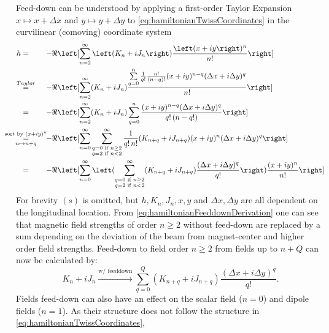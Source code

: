 Feed-down can be understood by applying a first-order Taylor Expansion $x \mapsto x + \Delta x$ and $y \mapsto y + \Delta y$
to \cref{eq:hamiltonianTwissCoordinates} in the 
curvilinear (comoving) coordinate system
%
\begin{equation}
   \label{eq:hamiltonianFeeddownDerivation}
   \begin{split}
   h
   &= \qquad 
   -\ReOf{\sum_{n = 2}^\infty \left(K_n + iJ_n\right)\frac{\left(x+iy\right)^n}{n!}} \\
   &\overeq{Taylor} \qquad
    -\ReOf{
        \sum_{n = 2}^\infty (K_n + iJ_n)
        \frac{\sum\limits_{q=0}^{n} \frac{1}{q!} \frac{n!}{(n-q)!}(x+iy)^{n-q} (\Delta x + i \Delta y)^q}{n!}
    } \\
    &=\qquad
     -\ReOf{
         \sum_{n = 2}^\infty (K_n + iJ_n)
         \sum\limits_{q = 0}^{n} \frac{(x+iy)^{n-q} (\Delta x + i \Delta y)^q}{q!\, (n-q!)} 
      } \\
     &\myoverunder{\text{sort by } (x + iy)^n}{=}{n \mapsto n+q} \qquad
     - \ReOf{
        \sum_{n = 0}^\infty \sum_{\substack{q=0 \text{ if } n \geq 2 \\ q = 2 \text{  if } n < 2 }}^{\infty} \frac{1}{q!\, n!}
        (K_{n+q} + iJ_{n+q}) (x + iy)^n (\Delta x + i \Delta y)^q 
     } \\
     &= \qquad
     - \ReOf{\sum_{n = 0}^\infty 
        \left( \sum_{\substack{q=0 \text{ if } n \geq 2 \\ q = 2 \text{  if } n < 2 }}^{\infty} 
        (K_{n+q} + iJ_{n+q}) \frac{(\Delta x + i \Delta y)^q}{q!} \right)
        \frac{(x + iy)^n}{n!}
     }
   \end{split}
\end{equation}
%
For brevity $(s)$ is omitted, but $h, K_n, J_n, x, y$ and $\Delta x, \Delta y$ are all dependent on the longitudinal location.
From \cref{eq:hamiltonianFeeddownDerivation} one can see that magnetic field strengths
of order $n \geq 2$ without feed-down are replaced by a sum depending  on the deviation of the beam from 
magnet-center and higher order field strengths.
Feed-down to field order $n \geq 2$ from fields up to $n + Q$ can now be calculated by:
%
\begin{equation}
    \label{eq:feeddownOrderN}
    K_n + iJ_n \overset{\text{w/ feeddown}}{\rightarrow} \sum_{q = 0}^{Q} (K_{n+q} + iJ_{n+q}) \frac{(\Delta x + i \Delta y)^q}{q!}.
\end{equation}
%
Fields feed-down can also have an effect on the scalar field ($n = 0$) and dipole fields ($n = 1$).
As their structure does not follow the structure in \cref{eq:hamiltonianTwissCoordinates},
